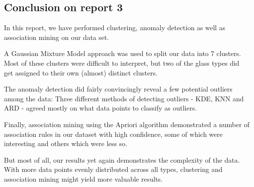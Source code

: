 \subsection{Conclusion on report 3}
In this report, we have performed clustering, anomaly detection as well as association mining on our data set. 

A Gaussian Mixture Model approach was used to split our data into 7 clusters. Most of these clusters were difficult to interpret, but two of the glass types did get assigned to their own (almost) distinct clusters.

The anomaly detection did fairly convincingly reveal a few potential outliers among the data: Three different methods of detecting outliers - KDE, KNN and ARD - agreed mostly on what data points to classify as outliers.

Finally, association mining using the Apriori algorithm demonstrated a number of association rules in our dataset with high confidence, some of which were interesting and others which were less so.

But most of all, our results yet again demonstrates the complexity of the data. With more data points evenly distributed across all types, clustering and association mining might yield more valuable results. 

